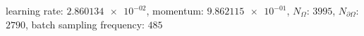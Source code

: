 learning rate: $\num[scientific-notation=true]{2.860134e-02}$, momentum: $\num[scientific-notation=true]{9.862115e-01}$, $N_{\Omega}$: $\num[scientific-notation=false]{3995}$, $N_{\partial\Omega}$: $\num[scientific-notation=false]{2790}$, batch sampling frequency: $\num[scientific-notation=false]{485}$